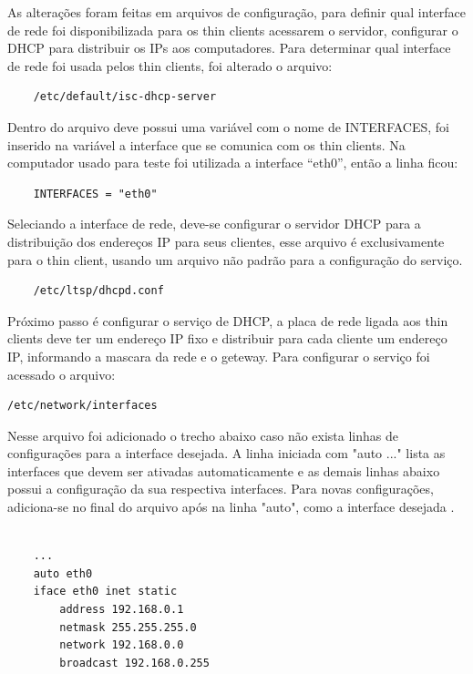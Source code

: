\documentclass[
	12pt,				%
	openright,			%
	twoside,			%
	a4paper,			%
	chapter=TITLE,		%
	english,			%
	brazil				%
	]{abntex2}
\begin{document}
As alterações foram feitas em arquivos de configuração, para definir qual interface de rede foi disponibilizada para os thin clients acessarem o servidor,  configurar o DHCP para distribuir os IPs aos computadores. Para determinar qual interface de rede foi usada pelos thin clients, foi alterado o arquivo:


\begin{verbatim}
	/etc/default/isc-dhcp-server
\end{verbatim}  

Dentro do arquivo deve possui uma variável com o nome de INTERFACES, foi inserido na variável a interface que se comunica com os thin clients. Na computador usado para teste foi utilizada a interface “eth0”, então a linha ficou:


\begin{verbatim}
	INTERFACES = "eth0"
\end{verbatim}

Seleciando a interface de rede, deve-se configurar o servidor DHCP para a distribuição dos endereços IP para seus clientes, esse arquivo é exclusivamente para o thin client, usando um arquivo não padrão para a configuração do serviço. 

\begin{verbatim}
	/etc/ltsp/dhcpd.conf
\end{verbatim}  


Próximo passo é configurar o serviço de DHCP, a placa de rede ligada aos thin clients deve ter um endereço IP fixo e distribuir para cada cliente um endereço IP, informando a mascara da rede e o geteway. Para configurar o serviço foi acessado o arquivo: 


\begin{verbatim}
/etc/network/interfaces
\end{verbatim} 

Nesse arquivo foi adicionado o trecho abaixo caso não exista linhas de configurações para a interface desejada. A linha iniciada com "auto ..." lista as interfaces que devem ser ativadas automaticamente e as demais linhas abaixo possui a configuração da sua respectiva interfaces. Para novas configurações, adiciona-se no final do arquivo após na linha "auto", como a interface desejada \cite{ClubeHardware,LTSP5}.


\begin{verbatim}

	...
	auto eth0  
	iface eth0 inet static
		address 192.168.0.1
		netmask 255.255.255.0
		network 192.168.0.0
		broadcast 192.168.0.255
\end{verbatim}
\end{document}
